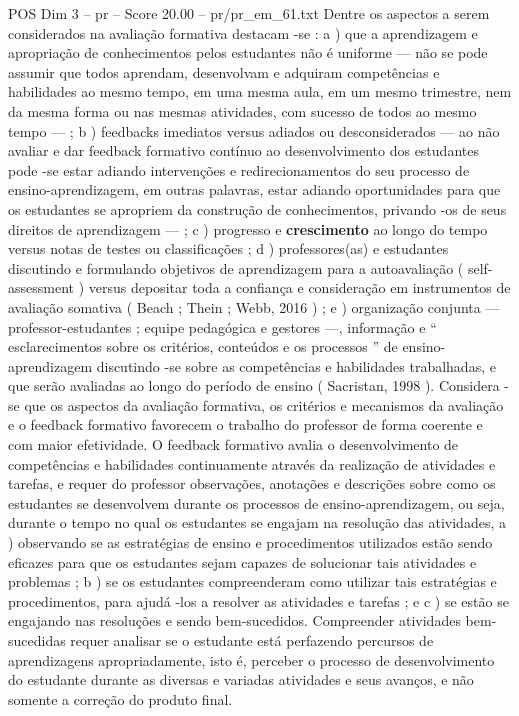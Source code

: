 \begin{textsample}{POS Dim 3 – pr – Score 20.00 – pr/pr\_em\_61.txt}
Dentre os aspectos a serem considerados na avaliação formativa destacam -se : a ) que a aprendizagem e apropriação de conhecimentos pelos estudantes não é uniforme — não se pode assumir que todos aprendam, desenvolvam e adquiram competências e habilidades ao mesmo tempo, em uma mesma aula, em um mesmo trimestre, nem da mesma forma ou nas mesmas atividades, com sucesso de todos ao mesmo tempo — ; b ) feedbacks imediatos versus adiados ou desconsiderados — ao não avaliar e dar feedback formativo contínuo ao desenvolvimento dos estudantes pode -se estar adiando intervenções e redirecionamentos do seu processo de ensino-aprendizagem, em outras palavras, estar adiando oportunidades para que os estudantes se apropriem da construção de conhecimentos, privando -os de seus direitos de aprendizagem — ; c ) progresso e \textbf{crescimento} ao longo do tempo versus notas de testes ou classificações ; d ) professores(as) e estudantes discutindo e formulando objetivos de aprendizagem para a autoavaliação ( self-assessment ) versus depositar toda a confiança e consideração em instrumentos de avaliação somativa ( Beach ; Thein ; Webb, 2016 ) ; e ) organização conjunta — professor-estudantes ; equipe pedagógica e gestores —, informação e “ esclarecimentos sobre os critérios, conteúdos e os processos ” de ensino-aprendizagem discutindo -se sobre as competências e habilidades trabalhadas, e que serão avaliadas ao longo do período de ensino ( Sacristan, 1998 ).
Considera -se que os aspectos da avaliação formativa, os critérios e mecanismos da avaliação e o feedback formativo favorecem o trabalho do professor de forma coerente e com maior efetividade.
O feedback formativo avalia o desenvolvimento de competências e habilidades continuamente através da realização de atividades e tarefas, e requer do professor observações, anotações e descrições sobre como os estudantes se desenvolvem durante os processos de ensino-aprendizagem, ou seja, durante o tempo no qual os estudantes se engajam na resolução das atividades, a ) observando se as estratégias de ensino e procedimentos utilizados estão sendo eficazes para que os estudantes sejam capazes de solucionar tais atividades e problemas ; b ) se os estudantes compreenderam como utilizar tais estratégias e procedimentos, para ajudá -los a resolver as atividades e tarefas ; e c ) se estão se engajando nas resoluções e sendo bem-sucedidos.
Compreender atividades bem-sucedidas requer analisar se o estudante está perfazendo percursos de aprendizagens apropriadamente, isto é, perceber o processo de desenvolvimento do estudante durante as diversas e variadas atividades e seus avanços, e não somente a correção do produto final.

\end{textsample}

